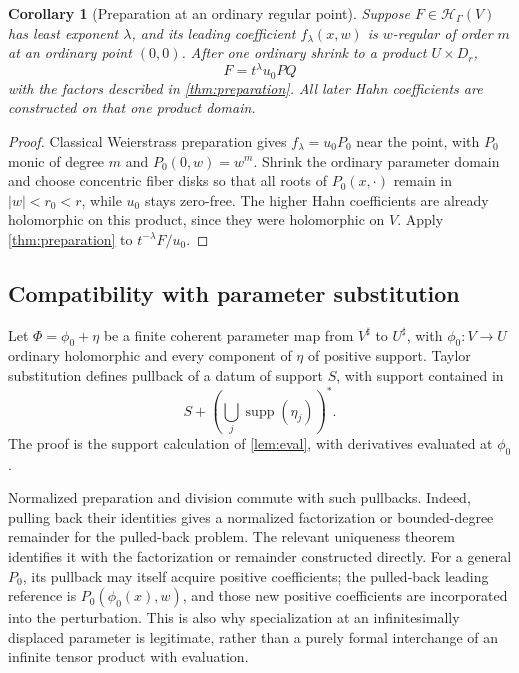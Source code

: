 \documentclass[11pt,oneside]{article}
\numberwithin{equation}{section}
\newtheorem{corollary}[theorem]{Corollary}
\theoremstyle{definition}
\theoremstyle{remark}\newtheorem{remark}[theorem]{Remark}
\newcommand{\HH}{\mathcal H_{\Gamma}}
\newcommand{\sh}{^{\sharp}}
\newcommand{\supp}{\operatorname{supp}}
\begin{document}
\begin{corollary}[Preparation at an ordinary regular point]\label{cor:localprep}
Suppose \(F\in\HH(V)\) has least exponent \(\lambda\), and its leading coefficient \(f_\lambda(x,w)\) is \(w\)-regular of order \(m\) at an ordinary point \((0,0)\). After one ordinary shrink to a product \(U\times D_r\),
\[
 F=t^\lambda u_0PQ
\]
with the factors described in \cref{thm:preparation}. All later Hahn coefficients are constructed on that one product domain.
\end{corollary}
\begin{proof}
Classical Weierstrass preparation gives \(f_\lambda=u_0P_0\) near the point, with \(P_0\) monic of degree \(m\) and \(P_0(0,w)=w^m\). Shrink the ordinary parameter domain and choose concentric fiber disks so that all roots of \(P_0(x,\cdot)\) remain in \(|w|<r_0<r\), while \(u_0\) stays zero-free. The higher Hahn coefficients are already holomorphic on this product, since they were holomorphic on \(V\). Apply \cref{thm:preparation} to \(t^{-\lambda}F/u_0\).
\end{proof}

\subsection{Compatibility with parameter substitution}\label{subsec:basechange}
Let \(\Phi=\phi_0+\eta\) be a finite coherent parameter map from \(V\sh\) to \(U\sh\), with \(\phi_0:V\to U\) ordinary holomorphic and every component of \(\eta\) of positive support. Taylor substitution defines pullback of a datum of support \(S\), with support contained in
\[
 S+\left(\bigcup_j\supp(\eta_j)\right)^*.
\]
The proof is the support calculation of \cref{lem:eval}, with derivatives evaluated at \(\phi_0\).

Normalized preparation and division commute with such pullbacks. Indeed, pulling back their identities gives a normalized factorization or bounded-degree remainder for the pulled-back problem. The relevant uniqueness theorem identifies it with the factorization or remainder constructed directly. For a general \(P_0\), its pullback may itself acquire positive coefficients; the pulled-back leading reference is \(P_0(\phi_0(x),w)\), and those new positive coefficients are incorporated into the perturbation. This is also why specialization at an infinitesimally displaced parameter is legitimate, rather than a purely formal interchange of an infinite tensor product with evaluation.
\end{document}
